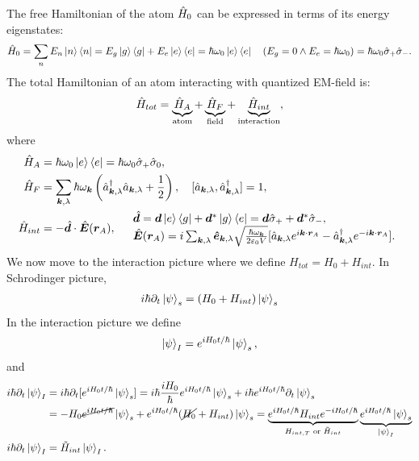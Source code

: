 The free Hamiltonian of the atom $\hat{H}_0$ can be expressed in terms of its energy eigenstates:
\begin{align*}
    \hat{H}_0=\sum_nE_n\left|n\right\rangle\left\langle n\right|=E_g\left|g\right\rangle\left\langle g\right|+E_e\left|e\right\rangle\left\langle e\right|=\hbar\omega_0\left|e\right\rangle\left\langle e\right|\quad(E_g=0\land E_e=\hbar\omega_0)=\hbar\omega_0\hat{\sigma}_+\hat{\sigma}_-.
\end{align*}
The total Hamiltonian of an atom interacting with quantized EM-field is:
\begin{align}
    \hat{H}_{tot}=\underbrace{\hat{H}_A}_{\text{atom}}+\underbrace{\hat{H}_F}_{\text{field}}+\underbrace{\hat{H}_{int}}_{\text{interaction}},
\end{align}
where 
\begin{align}
    \hat{H}_A&=\hbar\omega_0\left|e\right\rangle\left\langle e\right|=\hbar\omega_0\hat{\sigma}_+\hat{\sigma}_0,\\
    \hat{H}_F&=\sum_{\bm{k},\lambda}\hbar\omega_{\bm{k}}\left(\hat{a}^\dagger_{\bm{k},\lambda}\hat{a}_{\bm{k},\lambda}+\frac{1}{2}\right),\quad[\hat{a}_{\bm{k},\lambda},\hat{a}^\dagger_{\bm{k},\lambda}]=1,\\
    \hat{H}_{int}&=-\hat{\bm{d}}\cdot\hat{\bm{E}}(\bm{r}_A),\quad
    \begin{array}{l}
        \hat{\bm{d}}=\bm{d}\left|e\right\rangle\left\langle g\right|+\bm{d}^*\left|g\right\rangle\left\langle e\right|=\bm{d}\hat{\sigma}_++\bm{d}^*\hat{\sigma}_-,\\    
        \hat{\bm{E}}(\bm{r}_A)=i\sum_{\bm{k},\lambda}\bm{\hat{e}}_{\bm{k},\lambda}\sqrt{\frac{\hbar\omega_{\bm{k}}}{2\varepsilon_0V}}[\hat{a}_{\bm{k},\lambda}e^{i\bm{k}\cdot\bm{r}_A}-\hat{a}^\dagger_{\bm{k},\lambda}
    e^{-i\bm{k}\cdot\bm{r}_A}].
    \end{array}
\end{align}
We now move to the interaction picture where we define $H_{tot}=H_0+H_{int}$. In Schrodinger picture,
\begin{align*}
    i\hbar\partial_t\left|\psi\right\rangle_s=(H_0+H_{int})\left|\psi\right\rangle_s
\end{align*}
In the interaction picture we define 
\begin{align*}
    \left|\psi\right\rangle_I=e^{iH_0t/\hbar}\left|\psi\right\rangle_s,
\end{align*}
and 
\begin{align*}
    i\hbar\partial_t\left|\psi\right\rangle_I&=i\hbar\partial_t[e^{iH_0t/\hbar}\left|\psi\right\rangle_s]=i\hbar\frac{iH_0}{\hbar}e^{iH_0t/\hbar}\left|\psi\right\rangle_s+i\hbar e^{iH_0t/\hbar}\partial_t\left|\psi\right\rangle_s\\
    &=-H_0\cancel{e^{iH_0t/\hbar}}\left|\psi\right\rangle_s+e^{iH_0t/\hbar}(\cancel{H_0}+H_{int})\left|\psi\right\rangle_s=\underbrace{e^{iH_0t/\hbar}H_{int}e^{-iH_0t/\hbar}}_{H_{int,T}\text{ or }\tilde{H}_{int}}
    \underbrace{e^{iH_0t/\hbar}\left|\psi\right\rangle_s}_{\left|\psi\right\rangle_I}\\
    i\hbar\partial_t\left|\psi\right\rangle_I&=\tilde{H}_{int}\left|\psi\right\rangle_I.
\end{align*}
